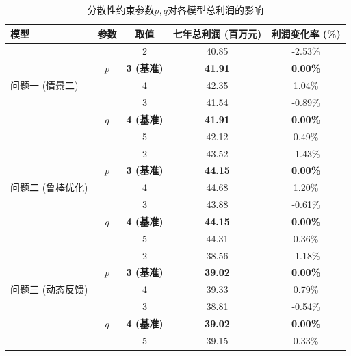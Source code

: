 \begin{table}[H]
    \centering
    \caption{分散性约束参数$p, q$对各模型总利润的影响}
    \label{tab:pq_sensitivity}
    \begin{tabular}{@{}lcccc@{}}
        \toprule
        模型         & 参数 & 取值 & 七年总利润 (百万元) & 利润变化率 (\%) \\
        \midrule
        \multirow{5}{*}{问题一 (情景二)} 
                     & \multirow{3}{*}{$p$} & 2    & 40.85 & -2.53\% \\
                     &      & \textbf{3 (基准)} & \textbf{41.91} & \textbf{0.00\%}  \\
                     &      & 4    & 42.35 & 1.04\%  \\
        \cmidrule(l){2-5}
                     & \multirow{3}{*}{$q$} & 3    & 41.54 & -0.89\% \\
                     &      & \textbf{4 (基准)} & \textbf{41.91} & \textbf{0.00\%}  \\
                     &      & 5    & 42.12 & 0.49\%  \\
        \midrule
        \multirow{5}{*}{问题二 (鲁棒优化)}
                     & \multirow{3}{*}{$p$} & 2    & 43.52 & -1.43\% \\
                     &      & \textbf{3 (基准)} & \textbf{44.15} & \textbf{0.00\%}  \\
                     &      & 4    & 44.68 & 1.20\%  \\
        \cmidrule(l){2-5}
                     & \multirow{3}{*}{$q$} & 3    & 43.88 & -0.61\% \\
                     &      & \textbf{4 (基准)} & \textbf{44.15} & \textbf{0.00\%}  \\
                     &      & 5    & 44.31 & 0.36\%  \\
        \midrule
        \multirow{5}{*}{问题三 (动态反馈)}
                     & \multirow{3}{*}{$p$} & 2    & 38.56 & -1.18\% \\
                     &      & \textbf{3 (基准)} & \textbf{39.02} & \textbf{0.00\%}  \\
                     &      & 4    & 39.33 & 0.79\%  \\
        \cmidrule(l){2-5}
                     & \multirow{3}{*}{$q$} & 3    & 38.81 & -0.54\% \\
                     &      & \textbf{4 (基准)} & \textbf{39.02} & \textbf{0.00\%}  \\
                     &      & 5    & 39.15 & 0.33\%  \\
        \bottomrule
    \end{tabular}
\end{table}


